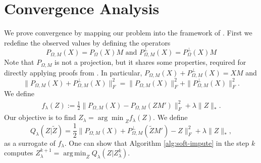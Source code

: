 \documentclass[preprint]{imsart}
\numberwithin{equation}{section}
\theoremstyle{plain}
\DeclareMathOperator*{\argmin}{arg\,min}
\begin{document}



\appendix

\section{Convergence Analysis}\label{s:convergence}

We prove convergence by mapping our problem into the framework of \citet{mazumder2010spectral}. First we redefine the observed values by defining the operators
\[
P_{\Omega,M}(X) = P_\Omega(X)M \text{ and } P_{\Omega,M}^\perp(X) = P_\Omega^\perp(X)M
\]
Note that $P_{\Omega,M}$ is not a projection, but it shares some properties, required for directly applying proofs from \citep{mazumder2010spectral}. In particular, 
$P_{\Omega,M}(X) + P_{\Omega,M}^\perp(X) = XM$ and
\begin{equation}
	\|P_{\Omega,M}(X) + P_{\Omega,M}^\perp(X)\|_F^2 = \|P_{\Omega,M}(X)\|_F^2 + \|P_{\Omega,M}^\perp(X)\|_F^2.
\end{equation} We define
\begin{align}\label{eq:helper-function}
 f_\lambda(Z) := \frac{1}{2} \|P_{\Omega,M}(X) - P_{\Omega,M}(ZM')\|_F^2 + \lambda\|Z\|_*.
\end{align}
Our objective is to find $ Z_\lambda = {\arg\min}_Z f_\lambda(Z)$. We define
\[
Q_\lambda(Z|\tilde{Z}) = \frac{1}{2}\|P_{\Omega,M}(X) + P_{\Omega,M}^{\perp}(\tilde{Z} M') - Z\|_F^2 + \lambda \|Z\|_*,
\]
as a surrogate of $f_\lambda$. One can show that Algorithm \ref{alg:soft-impute} in the step $k$ computes $Z_\lambda^{k+1} = \argmin_Z Q_\lambda(Z|Z_\lambda^k)$.
\end{document}
